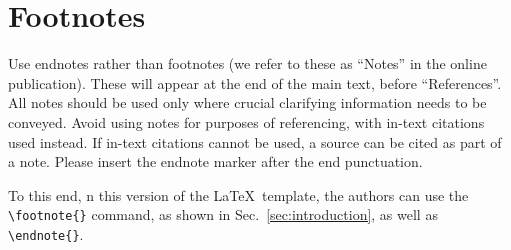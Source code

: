 \section{Footnotes}\label{sec:footnotes}

Use endnotes rather than footnotes 
(we refer to these as ``Notes'' in the online publication). 
These will appear at the end of the main text, before ``References''.
All notes should be used only where crucial clarifying information
needs to be conveyed.
Avoid using notes for purposes of referencing, with in-text citations used 
instead. 
If in-text citations cannot be used, a source can be cited as part of a note.
Please insert the endnote marker after the end punctuation.

To this end, n this version of the \LaTeX\ template, the authors can
use the \verb=\footnote{}= command, as shown in Sec.~\ref{sec:introduction}, 
as well as \verb=\endnote{}=.